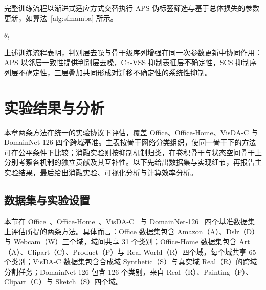完整训练流程以渐进式适应方式交替执行 APS 伪标签筛选与基于总体损失的参数更新，如算法~\ref{alg:sfmamba} 所示。

\begin{algorithm}[!htb]
  \label{alg:sfmamba}
  \small
  \BlankLine
  \Return $\theta_t$
\end{algorithm}

上述训练流程表明，判别层去噪与骨干级序列增强在同一次参数更新中协同作用：APS 以邻居一致性提供判别层去噪，Ch-VSS 抑制表征层不确定性，SCS 抑制序列层不确定性，三层叠加共同形成对迁移不确定性的系统性抑制。

\section{实验结果与分析}

\label{sec:chap2_experiments}

本章两条方法在统一的实验协议下评估，覆盖 Office、Office-Home、VisDA-C 与 DomainNet-126 四个跨域基准。主表按骨干网络分类组织，使同一骨干下的方法可在公平条件下比较；消融实验则按抑制机制归类，在卷积骨干与状态空间骨干上分别考察各机制的独立贡献及其互补性。以下先给出数据集与实现细节，再报告主实验结果，最后给出消融实验、可视化分析与计算效率分析。

\subsection{数据集与实验设置}

本节在 Office~\cite{saenko2010adapting}、Office-Home~\cite{venkateswara2017deep}、VisDA-C~\cite{peng2017visda} 与 DomainNet-126~\cite{peng2019moment} 四个基准数据集上评估所提的两条方法。具体而言：Office 数据集包含 Amazon（A）、Dslr（D）与 Webcam（W）三个域，域间共享 31 个类别；Office-Home 数据集包含 Art（A）、Clipart（C）、Product（P）与 Real World（R）四个域，每个域共享 65 个类别；VisDA-C 数据集包含合成域 Synthetic（S）与真实域 Real（R）的跨域分割任务；DomainNet-126 包含 126 个类别，来自 Real（R）、Painting（P）、Clipart（C）与 Sketch（S）四个域。

